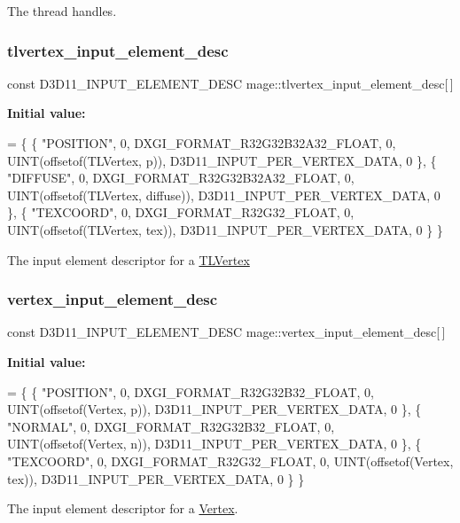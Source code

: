 The thread handles. \hypertarget{namespacemage_a0f27594da3814c163fe995326acf6c5e}{}\label{namespacemage_a0f27594da3814c163fe995326acf6c5e} 
\subsubsection{\texorpdfstring{tlvertex\+\_\+input\+\_\+element\+\_\+desc}{tlvertex\_input\_element\_desc}}
{\footnotesize\ttfamily const D3\+D11\+\_\+\+I\+N\+P\+U\+T\+\_\+\+E\+L\+E\+M\+E\+N\+T\+\_\+\+D\+E\+SC mage\+::tlvertex\+\_\+input\+\_\+element\+\_\+desc\mbox{[}$\,$\mbox{]}}

{\bfseries Initial value\+:}
\begin{DoxyCode}
= \{
        \{ \textcolor{stringliteral}{"POSITION"}, 0, DXGI\_FORMAT\_R32G32B32A32\_FLOAT, 0, UINT(offsetof(TLVertex, p)),       
      D3D11\_INPUT\_PER\_VERTEX\_DATA, 0 \},
        \{ \textcolor{stringliteral}{"DIFFUSE"},  0, DXGI\_FORMAT\_R32G32B32A32\_FLOAT, 0, UINT(offsetof(TLVertex, diffuse)), 
      D3D11\_INPUT\_PER\_VERTEX\_DATA, 0 \},
        \{ \textcolor{stringliteral}{"TEXCOORD"}, 0, DXGI\_FORMAT\_R32G32\_FLOAT,       0, UINT(offsetof(TLVertex, tex)),     
      D3D11\_INPUT\_PER\_VERTEX\_DATA, 0 \}
    \}
\end{DoxyCode}
The input element descriptor for a \hyperlink{structmage_1_1_t_l_vertex}{T\+L\+Vertex} \hypertarget{namespacemage_a8647e0bbbbe87e5c6d7a4d4622230119}{}\label{namespacemage_a8647e0bbbbe87e5c6d7a4d4622230119} 
\subsubsection{\texorpdfstring{vertex\+\_\+input\+\_\+element\+\_\+desc}{vertex\_input\_element\_desc}}
{\footnotesize\ttfamily const D3\+D11\+\_\+\+I\+N\+P\+U\+T\+\_\+\+E\+L\+E\+M\+E\+N\+T\+\_\+\+D\+E\+SC mage\+::vertex\+\_\+input\+\_\+element\+\_\+desc\mbox{[}$\,$\mbox{]}}

{\bfseries Initial value\+:}
\begin{DoxyCode}
= \{
        \{ \textcolor{stringliteral}{"POSITION"}, 0, DXGI\_FORMAT\_R32G32B32\_FLOAT, 0, UINT(offsetof(Vertex, p)),   
      D3D11\_INPUT\_PER\_VERTEX\_DATA, 0 \},
        \{ \textcolor{stringliteral}{"NORMAL"},   0, DXGI\_FORMAT\_R32G32B32\_FLOAT, 0, UINT(offsetof(Vertex, n)),   
      D3D11\_INPUT\_PER\_VERTEX\_DATA, 0 \},
        \{ \textcolor{stringliteral}{"TEXCOORD"}, 0, DXGI\_FORMAT\_R32G32\_FLOAT,    0, UINT(offsetof(Vertex, tex)), 
      D3D11\_INPUT\_PER\_VERTEX\_DATA, 0 \}
    \}
\end{DoxyCode}
The input element descriptor for a \hyperlink{structmage_1_1_vertex}{Vertex}. \hypertarget{namespacemage_a801b62787c07e98767a88f55154269a1}{}\label{namespacemage_a801b62787c07e98767a88f55154269a1} 
